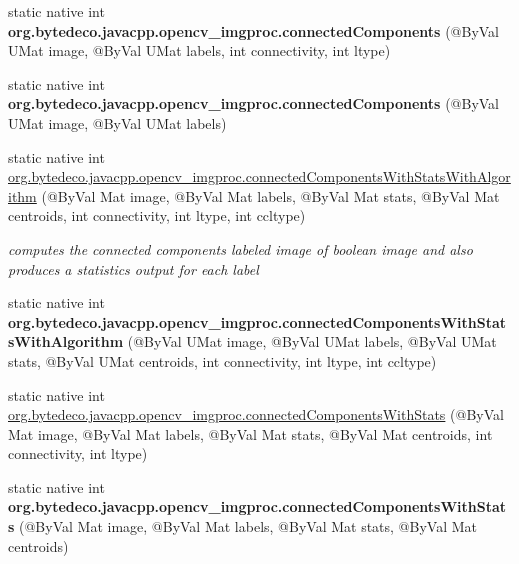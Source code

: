 \begin{DoxyCompactItemize}
\item 
\mbox{\label{group__imgproc__shape_ga5d63d5173052c0ffe58d32ece0243b02}} 
static native int {\bfseries org.\+bytedeco.\+javacpp.\+opencv\+\_\+imgproc.\+connected\+Components} (@By\+Val U\+Mat image, @By\+Val U\+Mat labels, int connectivity, int ltype)
\item 
\mbox{\label{group__imgproc__shape_ga6bf59a9541c5c2d1ee90b91d817d8dfd}} 
static native int {\bfseries org.\+bytedeco.\+javacpp.\+opencv\+\_\+imgproc.\+connected\+Components} (@By\+Val U\+Mat image, @By\+Val U\+Mat labels)
\item 
static native int \hyperlink{group__imgproc__shape_gaed0a27b064f9360aa2cdfc5368f6c81c}{org.\+bytedeco.\+javacpp.\+opencv\+\_\+imgproc.\+connected\+Components\+With\+Stats\+With\+Algorithm} (@By\+Val Mat image, @By\+Val Mat labels, @By\+Val Mat stats, @By\+Val Mat centroids, int connectivity, int ltype, int ccltype)
\begin{DoxyCompactList}\small\item\em computes the connected components labeled image of boolean image and also produces a statistics output for each label \end{DoxyCompactList}\item 
\mbox{\label{group__imgproc__shape_gabccfc57abcae8bb4a852270232ef9b05}} 
static native int {\bfseries org.\+bytedeco.\+javacpp.\+opencv\+\_\+imgproc.\+connected\+Components\+With\+Stats\+With\+Algorithm} (@By\+Val U\+Mat image, @By\+Val U\+Mat labels, @By\+Val U\+Mat stats, @By\+Val U\+Mat centroids, int connectivity, int ltype, int ccltype)
\item 
static native int \hyperlink{group__imgproc__shape_gab229ea94bd41ec2bbcda17ba9d2968fe}{org.\+bytedeco.\+javacpp.\+opencv\+\_\+imgproc.\+connected\+Components\+With\+Stats} (@By\+Val Mat image, @By\+Val Mat labels, @By\+Val Mat stats, @By\+Val Mat centroids, int connectivity, int ltype)
\item 
\mbox{\label{group__imgproc__shape_ga63ef30500bff6a4af684eee1b3c029f6}} 
static native int {\bfseries org.\+bytedeco.\+javacpp.\+opencv\+\_\+imgproc.\+connected\+Components\+With\+Stats} (@By\+Val Mat image, @By\+Val Mat labels, @By\+Val Mat stats, @By\+Val Mat centroids)
\item 

\end{DoxyCompactItemize}
